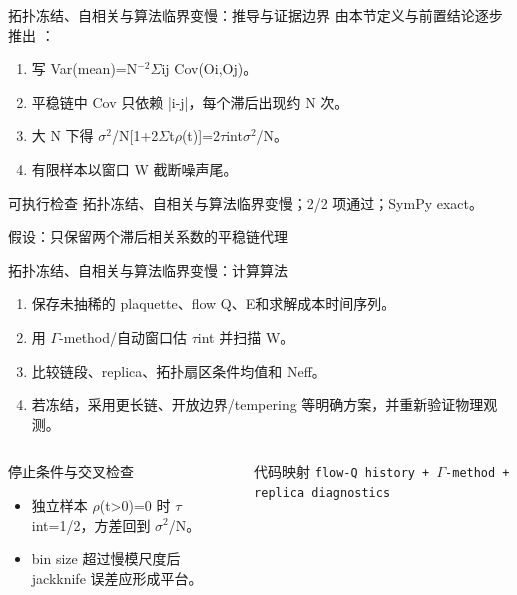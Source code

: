 \begin{frame}[t]{拓扑冻结、自相关与算法临界变慢：推导与证据边界}
\footnotesize
{}\quad 由本节定义与前置结论逐步推出 ：
\begin{enumerate}
\item 写 Var(mean)=N\ensuremath{^{-2}}\ensuremath{\Sigma}ij Cov(Oi,Oj)。
\item 平稳链中 Cov 只依赖 |i-j|，每个滞后出现约 N 次。
\item 大 N 下得 \ensuremath{\sigma}\ensuremath{^{2}}/\allowbreak{}N[1+2\ensuremath{\Sigma}t\ensuremath{\rho}(t)]=2\ensuremath{\tau}int\ensuremath{\sigma}\ensuremath{^{2}}/\allowbreak{}N。
\item 有限样本以窗口 W 截断噪声尾。
\end{enumerate}\begin{block}{可执行检查}
\quad 拓扑冻结、自相关与算法临界变慢；2/2 项通过；SymPy exact。
\par\scriptsize 假设：只保留两个滞后相关系数的平稳链代理
\end{block}
\end{frame}

\begin{frame}[t]{拓扑冻结、自相关与算法临界变慢：计算算法}
\footnotesize
{}\begin{enumerate}
\item 保存未抽稀的 plaquette、flow Q、E和求解成本时间序列。
\item 用 \ensuremath{\Gamma}-method/\allowbreak{}自动窗口估 \ensuremath{\tau}int 并扫描 W。
\item 比较链段、replica、拓扑扇区条件均值和 Neff。
\item 若冻结，采用更长链、开放边界/\allowbreak{}tempering 等明确方案，并重新验证物理观测。
\end{enumerate}\begin{columns}[T,onlytextwidth]
\begin{block}{停止条件与交叉检查}\scriptsize\begin{itemize}
\item[\CheckMark] 独立样本 \ensuremath{\rho}(t>0)=0 时 \ensuremath{\tau}int=1/\allowbreak{}2，方差回到 \ensuremath{\sigma}\ensuremath{^{2}}/\allowbreak{}N。
\item[\CheckMark] bin size 超过慢模尺度后 jackknife 误差应形成平台。
\end{itemize}\end{block}
\begin{block}{代码映射}
\scriptsize \texttt{flow-Q history + \ensuremath{\Gamma}-method + replica diagnostics}
\end{block}\end{columns}\end{frame}

